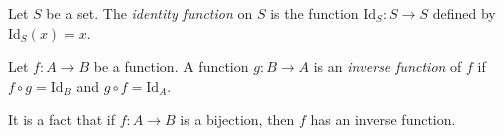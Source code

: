 \begin{definition}[Identity]
Let $S$ be a set. The \textit{identity function} on $S$ is the function $\mbox{Id}_S: S \longrightarrow S$ defined by $\mbox{Id}_S(x)=x$.
\end{definition}

\begin{definition}[Inverse]
Let $f: A \to B$ be a function. A function $g: B \to A$ is an \textit{inverse function} of $f$ if $f \circ g = \mbox{Id}_B$ and $g \circ f = \mbox{Id}_A$.
\end{definition}

It is a fact that if $f: A \to B$ is a bijection, then $f$ has an inverse function.